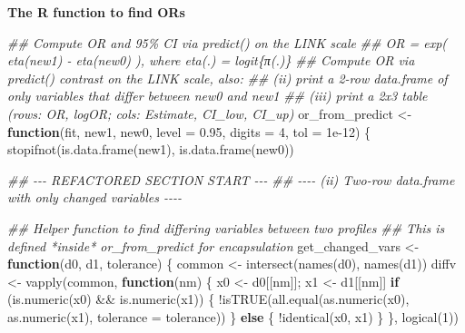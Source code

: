 \documentclass[
  letterpaper,
]{scrbook}
\newenvironment{Shaded}{\begin{snugshade}}{\end{snugshade}}
\newcommand{\AttributeTok}[1]{\textcolor[rgb]{0.40,0.45,0.13}{#1}}
\newcommand{\ControlFlowTok}[1]{\textcolor[rgb]{0.00,0.23,0.31}{\textbf{#1}}}
\newcommand{\DecValTok}[1]{\textcolor[rgb]{0.68,0.00,0.00}{#1}}
\newcommand{\DocumentationTok}[1]{\textcolor[rgb]{0.37,0.37,0.37}{\textit{#1}}}
\newcommand{\FloatTok}[1]{\textcolor[rgb]{0.68,0.00,0.00}{#1}}
\newcommand{\FunctionTok}[1]{\textcolor[rgb]{0.28,0.35,0.67}{#1}}
\newcommand{\NormalTok}[1]{\textcolor[rgb]{0.00,0.23,0.31}{#1}}
\newcommand{\OtherTok}[1]{\textcolor[rgb]{0.00,0.23,0.31}{#1}}
\newcommand{\SpecialCharTok}[1]{\textcolor[rgb]{0.37,0.37,0.37}{#1}}
\begin{document}
\textbf{The R function to find ORs}

\begin{Shaded}
\begin{Highlighting}[]
\DocumentationTok{\#\# Compute OR and 95\% CI via predict() on the LINK scale}
\DocumentationTok{\#\# OR = exp( eta(new1) {-} eta(new0) ), where eta(.) = logit\{π(.)\}}
\DocumentationTok{\#\# Compute OR via predict() contrast on the LINK scale, also:}
\DocumentationTok{\#\# (ii) print a 2{-}row data.frame of only variables that differ between new0 and new1}
\DocumentationTok{\#\# (iii) print a 2x3 table (rows: OR, logOR; cols: Estimate, CI\_low, CI\_up)}
\NormalTok{or\_from\_predict }\OtherTok{\textless{}{-}} \ControlFlowTok{function}\NormalTok{(fit, new1, new0, }\AttributeTok{level =} \FloatTok{0.95}\NormalTok{, }\AttributeTok{digits =} \DecValTok{4}\NormalTok{, }\AttributeTok{tol =} \FloatTok{1e{-}12}\NormalTok{) \{}
  \FunctionTok{stopifnot}\NormalTok{(}\FunctionTok{is.data.frame}\NormalTok{(new1), }\FunctionTok{is.data.frame}\NormalTok{(new0))}

  \DocumentationTok{\#\# {-}{-}{-} REFACTORED SECTION START {-}{-}{-}}
  \DocumentationTok{\#\# {-}{-}{-}{-} (ii) Two{-}row data.frame with only changed variables {-}{-}{-}{-}}
  
  \DocumentationTok{\#\# Helper function to find differing variables between two profiles}
  \DocumentationTok{\#\# This is defined *inside* or\_from\_predict for encapsulation}
\NormalTok{  get\_changed\_vars }\OtherTok{\textless{}{-}} \ControlFlowTok{function}\NormalTok{(d0, d1, tolerance) \{}
\NormalTok{    common }\OtherTok{\textless{}{-}} \FunctionTok{intersect}\NormalTok{(}\FunctionTok{names}\NormalTok{(d0), }\FunctionTok{names}\NormalTok{(d1))}
\NormalTok{    diffv  }\OtherTok{\textless{}{-}} \FunctionTok{vapply}\NormalTok{(common, }\ControlFlowTok{function}\NormalTok{(nm) \{}
\NormalTok{      x0 }\OtherTok{\textless{}{-}}\NormalTok{ d0[[nm]]; x1 }\OtherTok{\textless{}{-}}\NormalTok{ d1[[nm]]}
      \ControlFlowTok{if}\NormalTok{ (}\FunctionTok{is.numeric}\NormalTok{(x0) }\SpecialCharTok{\&\&} \FunctionTok{is.numeric}\NormalTok{(x1)) \{}
        \SpecialCharTok{!}\FunctionTok{isTRUE}\NormalTok{(}\FunctionTok{all.equal}\NormalTok{(}\FunctionTok{as.numeric}\NormalTok{(x0), }\FunctionTok{as.numeric}\NormalTok{(x1), }\AttributeTok{tolerance =}\NormalTok{ tolerance))}
\NormalTok{      \} }\ControlFlowTok{else}\NormalTok{ \{}
        \SpecialCharTok{!}\FunctionTok{identical}\NormalTok{(x0, x1)}
\NormalTok{      \}}
\NormalTok{    \}, }\FunctionTok{logical}\NormalTok{(}\DecValTok{1}\NormalTok{))}
    

\end{Highlighting}
\end{Shaded}
\end{document}
